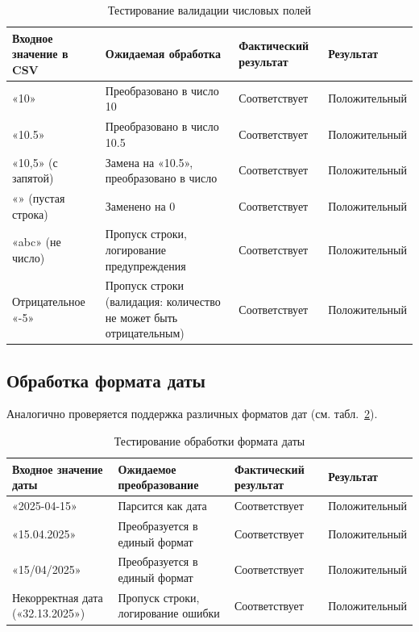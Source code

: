 \begin{table}[H]
\caption{\label{tab:testNumbers}Тестирование валидации числовых полей}
\small
\begin{center}
\vspace{-0.5cm}\begin{tabular}{|p{4.5cm}|p{4.5cm}|p{3cm}|p{3cm}|}
\hline
Входное значение в CSV & Ожидаемая обработка & Фактический результат & Результат \\ \hline
«10» & Преобразовано в число 10 & Соответствует & Положительный \\ \hline
«10.5» & Преобразовано в число 10.5 & Соответствует & Положительный \\ \hline
«10,5» (с запятой) & Замена на «10.5», преобразовано в число & Соответствует & Положительный \\ \hline
«» (пустая строка) & Заменено на 0 & Соответствует & Положительный \\ \hline
«abc» (не число) & Пропуск строки, логирование предупреждения & Соответствует & Положительный \\ \hline
Отрицательное «-5» & Пропуск строки (валидация: количество не может быть отрицательным) & Соответствует & Положительный \\ \hline
\end{tabular}
\end{center}
\end{table}

\subsection{Обработка формата даты}
Аналогично проверяется поддержка различных форматов дат (см. табл.~\ref{tab:testDate}).

\begin{table}[H]
\caption{\label{tab:testDate}Тестирование обработки формата даты}
\small
\begin{center}
\vspace{-0.5cm}\begin{tabular}{|p{4.5cm}|p{4.5cm}|p{3cm}|p{3cm}|}
\hline
Входное значение даты & Ожидаемое преобразование & Фактический результат & Результат \\ \hline
«2025-04-15» & Парсится как дата & Соответствует & Положительный \\ \hline
«15.04.2025» & Преобразуется в единый формат & Соответствует & Положительный \\ \hline
«15/04/2025» & Преобразуется в единый формат & Соответствует & Положительный \\ \hline
Некорректная дата («32.13.2025») & Пропуск строки, логирование ошибки & Соответствует & Положительный \\ \hline
\end{tabular}
\end{center}
\end{table}

